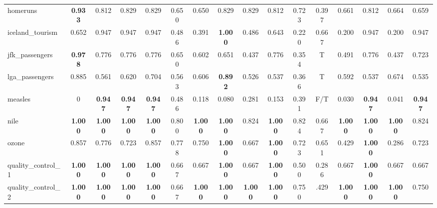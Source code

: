 \begin{table}
{\begin{tabular}{l|c|cccccccccccccc}
    homeruns & \textbf{0.933} & 0.812 & 0.829 & 0.829 & 0.650 & 0.650 & 0.829 & 0.829 & 0.812 & 0.723 & 0.397 & 0.661 & 0.812 & 0.664 & 0.659\\
    
    iceland\_tourism & 0.652 & 0.947 & 0.947 & 0.947 & 0.486 & 0.391 & \textbf{1.000} & 0.486 & 0.643 & 0.220 & 0.667 & 0.200 & 0.947 & 0.200 & 0.947\\
    
    jfk\_passengers & \textbf{0.978} & 0.776 & 0.776 & 0.776 & 0.650 & 0.602 & 0.651 & 0.437 & 0.776 & 0.354 & T & 0.491 & 0.776 & 0.437 & 0.723\\
    
    lga\_passengers & 0.885 & 0.561 & 0.620 & 0.704 & 0.563 & 0.606 & \textbf{0.892} & 0.526 & 0.537 & 0.366 & T & 0.592 & 0.537 & 0.674 & 0.535\\
    
    \cellcolor{gray!100}measles & \cellcolor{gray!100}0 & \cellcolor{gray!100}\textbf{0.947} & \cellcolor{gray!100}\textbf{0.947} & \cellcolor{gray!100}\textbf{0.947} & \cellcolor{gray!100}0.486 & \cellcolor{gray!100}0.118 & \cellcolor{gray!100}0.080 & \cellcolor{gray!100}0.281 & \cellcolor{gray!100}0.153 & \cellcolor{gray!100}0.391 & \cellcolor{gray!100}F/T & \cellcolor{gray!100}0.030 & \cellcolor{gray!100}\textbf{0.947} & \cellcolor{gray!100}0.041 & \cellcolor{gray!100}\textbf{0.947}\\
    
    
    nile & \textbf{1.000} & \textbf{1.000} & \textbf{1.000} & \textbf{1.000} & 0.800 & \textbf{1.000} & \textbf{1.000} & 0.824 & \textbf{1.000} & 0.824 & 0.667 & \textbf{1.000} & \textbf{1.000} & \textbf{1.000} & 0.824\\
    
    ozone & 0.857 & 0.776 & 0.723 & 0.857 & 0.778 & 0.750 & \textbf{1.000} & 0.667 & \textbf{1.000} & 0.723 & 0.651 & 0.429 & \textbf{1.000} & 0.286 & 0.723\\
    
    quality\_control\_1 & \textbf{1.000} & \textbf{1.000} & \textbf{1.000} & \textbf{1.000} & 0.667 & 0.667 & \textbf{1.000} & 0.667 & \textbf{1.000} & 0.500 & 0.286 & 0.667 & \textbf{1.000} & 0.667 & 0.667\\
    
    quality\_control\_2 & \textbf{1.000} & \textbf{1.000} & \textbf{1.000} & \textbf{1.000} & 0.667 & \textbf{1.000} & \textbf{1.000} & \textbf{1.000} & \textbf{1.000} & 0.750 & .429 & \textbf{1.000} & \textbf{1.000} & \textbf{1.000} & 0.750\\
    

\end{tabular}}
\end{table}
